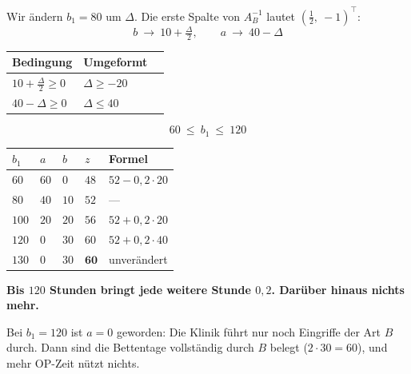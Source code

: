\begin{merksatz}
Wir ändern $b_1 = 80$ um $\Delta$. Die erste Spalte von $A_B^{-1}$ lautet $\left(\tfrac12,\ -1\right)^{\!\top}$:
\[ b \ \to\ 10 + \tfrac{\Delta}{2}, \qquad a \ \to\ 40 - \Delta \]

\begin{center}
\renewcommand{\arraystretch}{1.5}
\begin{tabular}{@{}P{2.8cm}P{2.6cm}P{2.4cm}@{}}
\toprule
\textbf{Bedingung} & \textbf{Umgeformt} & \\
\midrule
$10+\tfrac{\Delta}{2} \ge 0$ & $\Delta \ge -20$ & \\
$40-\Delta \ge 0$ & $\Delta \le 40$ & \\
\bottomrule
\end{tabular}
\end{center}

\[ \boxed{\ 60 \ \le\ b_1 \ \le\ 120\ } \]

\begin{center}
{\small
\renewcommand{\arraystretch}{1.48}
\begin{tabular}{@{}P{1.4cm}P{1.4cm}P{1.4cm}P{1.6cm}P{2.2cm}@{}}
\toprule
$b_1$ & $a$ & $b$ & $z$ & \textbf{Formel}\\
\midrule
$60$ & $60$ & $0$ & $48$ & $52-0{,}2\cdot20$\\
$80$ & $40$ & $10$ & $52$ & ---\\
$100$ & $20$ & $20$ & $56$ & $52+0{,}2\cdot20$\\
$120$ & $0$ & $30$ & $60$ & $52+0{,}2\cdot40$\\
$130$ & $0$ & $30$ & $\mathbf{60}$ & \textcolor{akzent}{unverändert}\\
\bottomrule
\end{tabular}}
\end{center}

\begin{center}
\begin{minipage}{0.9\textwidth}
\textbf{Bis $120$ Stunden bringt jede weitere Stunde $0{,}2$. Darüber hinaus nichts mehr.}
\end{minipage}
\end{center}

Bei $b_1 = 120$ ist $a = 0$ geworden: Die Klinik führt nur noch Eingriffe der Art $B$ durch. Dann sind die Bettentage vollständig durch $B$ belegt ($2 \cdot 30 = 60$), und mehr OP-Zeit nützt nichts.

\begin{center}
\begin{minipage}{0.88\textwidth}
\end{minipage}
\end{center}
\end{merksatz}

